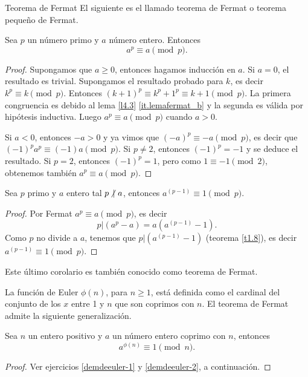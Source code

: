 \begin{section}{Teorema de Fermat}
El siguiente es el llamado teorema de Fermat o teorema pequeño de Fermat.

\begin{teorema}\label{t4.3} Sea $p$ un número primo y $a$ número
entero. Entonces
$$
a^p\equiv a\pmod{p}.
$$
\end{teorema}
\begin{proof} Supongamos que $a\ge 0$, entonces hagamos
inducción en $a$. Si $a=0$, el resultado es trivial. Supongamos el
resultado probado para $k$, es decir $k^p \equiv k \pmod{p}$.
Entonces $(k+1)^p \equiv k^p +1^p \equiv k+1 \pmod{p}$. La primera
congruencia es debido al lema \ref{l4.3} \ref{it.lemafermat_b} y la segunda es
válida por hipótesis inductiva. Luego $a^p\equiv a\pmod{p}$ cuando $a >0$.

Si $a<0$, entonces $-a>0$ y ya vimos que $(-a)^p \equiv -a
\pmod{p}$, es decir que $(-1)^pa^p \equiv (-1)a \pmod{p}$. Si
$p\not=2$, entonces $(-1)^p=-1$ y se deduce el resultado. Si
$p=2$, entonces $(-1)^p=1$, pero como $1\equiv -1 \pmod{2}$,
obtenemos también $a^p\equiv a\pmod{p}$.
\end{proof}

\begin{corolario}
    Sea $p$ primo y  $a$ entero tal $p\operatorname{\not|\,} a$, entonces $a^{(p-1)}\equiv 1\pmod{p}$.
\end{corolario}
\begin{proof}
    Por Fermat $a^p\equiv a\pmod{p}$, es decir 
    $$p|(a^p -a)=a(a^{(p-1)} -1).$$
    Como $p$ no divide a $a$, tenemos que $p|(a^{(p-1)} -1)$ (teorema \ref{t1.8}), es decir  $a^{(p-1)}\equiv 1\pmod{p}$.
\end{proof}

Este último corolario es también conocido como teorema de Fermat.



La función de Euler   $\phi(n)$, para $n\ge 1$, está definida como el cardinal del conjunto de los $x$ entre 1 y $n$ que son coprimos con $n$. El teorema de Fermat admite la siguiente generalización.

\begin{teorema}
    Sea $n$ un entero positivo y $a$ un número entero coprimo con $n$, entonces
$$
a^{\phi(n)} \equiv 1\pmod{n}.
$$
\end{teorema}
\begin{proof}
    Ver ejercicios \ref{demdeeuler-1} y \ref{demdeeuler-2}, a continuación.
\end{proof}


\end{section}
